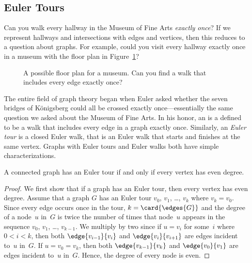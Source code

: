 \begin{editingnotes}
\subsection{Euler Tours}

Can you walk every hallway in the Museum of Fine Arts \emph{exactly
  once}?  If we represent hallways and intersections with edges and
vertices, then this reduces to a question about graphs.  For example,
could you visit every hallway exactly once in a museum with the
floor plan in Figure~\ref{fig:5BC}?

\begin{figure}



\caption{A possible floor plan for a museum. Can you find a walk that
  includes every edge exactly once?}

\label{fig:5BC}

\end{figure}

The entire field of graph theory began when Euler asked whether the seven
bridges of K\"onigsberg could all be crossed exactly once---essentially
the same question we asked about the Museum of Fine Arts.  In his honor,
an   is a defined to be a walk that
includes every edge in a graph exactly once.  Similarly, an \emph{Euler
  tour} is a closed Euler walk, that is an Euler walk that
  starts and finishes at the same vertex.  Graphs with Euler tours and
  Euler walks both have simple characterizations.
\begin{theorem}\label{thm:euler-tour}
A connected graph has an Euler tour if and only if every vertex has
even degree.
\end{theorem}

\begin{proof}
  We first show that if a graph has an Euler tour, then every vertex has
  even degree.  Assume that a graph $G$ has an Euler tour $v_0$, $v_1$,
  \dots, $v_k$ where $v_k = v_0$.  Since every edge occurs once in
  the tour, $k = \card{\edges{G}}$ and the degree of a node~$u$ in~$G$ is
  twice the number of times that node~$u$ appears in the sequence $v_0$,
  $v_1$, \dots, $v_{k-1}$.  We multiply by two since if $u = v_i$ for
  some~$i$ where $0 < i < k$, then both $\edge{v_{i - 1}}{v_i}$ and
  $\edge{v_i}{v_{i + 1}}$ are edges incident to~$u$ in~$G$.  If $u = v_0 =
  v_k$, then both $\edge{v_{k - 1}}{v_k}$ and $\edge{v_0}{v_1}$ are edges
  incident to~$u$ in~$G$.  Hence, the degree of every node is even.


\end{proof}
\end{editingnotes}
